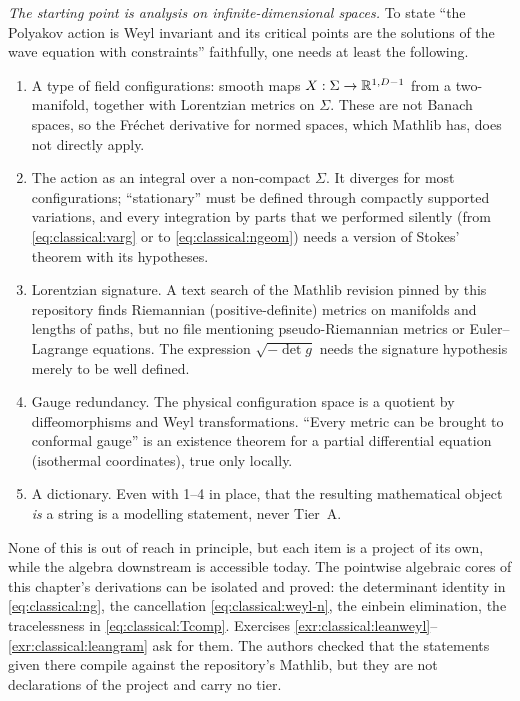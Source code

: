 \emph{The starting point is analysis on infinite-dimensional spaces.} To state ``the
Polyakov action is Weyl invariant and its critical points are the solutions of the wave
equation with constraints'' faithfully, one needs at least the following.
\begin{enumerate}[nosep]
\item A type of field configurations: smooth maps $X:\Sigma\to\mathbb{R}^{1,D-1}$ from a
two-manifold, together with Lorentzian metrics on $\Sigma$. These are not Banach spaces, so
the Fr\'echet derivative for normed spaces, which Mathlib has, does not directly apply.
\item The action as an integral over a non-compact $\Sigma$. It diverges for most
configurations; ``stationary'' must be defined through compactly supported variations, and
every integration by parts that we performed silently (from \eqref{eq:classical:varg} or to
\eqref{eq:classical:ngeom}) needs a version of Stokes' theorem with its hypotheses.
\item Lorentzian signature. A text search of the Mathlib revision pinned by this repository
finds Riemannian (positive-definite) metrics on manifolds and lengths of paths, but no file
mentioning pseudo-Riemannian metrics or Euler--Lagrange equations. The expression
$\sqrt{-\det g}$ needs the signature hypothesis merely to be well defined.
\item Gauge redundancy. The physical configuration space is a quotient by diffeomorphisms
and Weyl transformations. ``Every metric can be brought to conformal gauge'' is an existence
theorem for a partial differential equation (isothermal coordinates), true only locally.
\item A dictionary. Even with 1--4 in place, that the resulting mathematical object
\emph{is} a string is a modelling statement, never Tier~A.
\end{enumerate}
None of this is out of reach in principle, but each item is a project of its own, while the
algebra downstream is accessible today. The pointwise algebraic cores of this chapter's
derivations can be isolated and proved: the determinant identity in
\eqref{eq:classical:ng}, the cancellation \eqref{eq:classical:weyl-n}, the einbein
elimination, the tracelessness in \eqref{eq:classical:Tcomp}. Exercises
\ref{exr:classical:leanweyl}--\ref{exr:classical:leangram} ask for them. The authors checked
that the statements given there compile against the repository's Mathlib, but they are not
declarations of the project and carry no tier.

